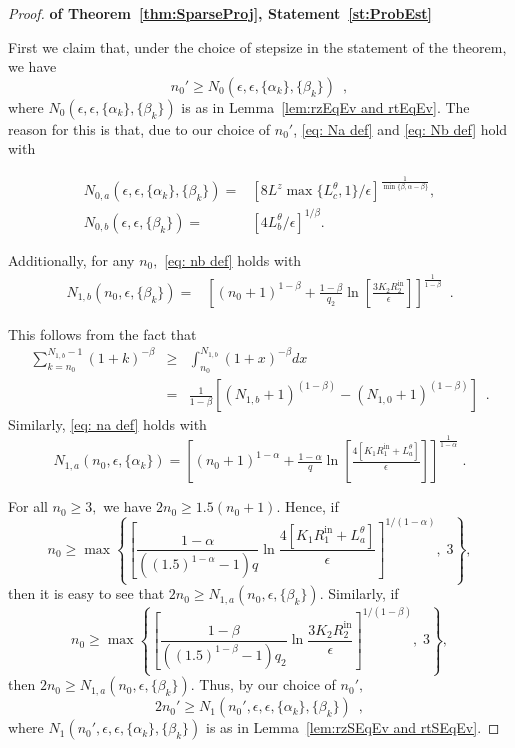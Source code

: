 \documentclass[usenames,dvipsnames,final,12pt]{colt2018} %
\newcommand{\Rti}{R_1^{\textrm{in}}}
\newcommand{\Kt}{K_1}
\newcommand{\Lt}[1]{L^{\theta}_{#1}}
\newcommand{\lz}{q_2}
\newcommand{\Rzi}{R_2^{\textrm{in}}}
\newcommand{\Lz}{L^z}
\newcommand{\Kz}{K_2}
\newcommand{\N}[1]{N_{0,#1}}
\newcommand{\n}[1]{N_{1,#1}}
\newcommand{\lm}{q}
\newcommand{\gugan}[1]{#1}
\begin{document}
\begin{proof}\textbf{of Theorem~\ref{thm:SparseProj}, Statement~\ref{st:ProbEst}}
%
{
First we claim that, under the choice of stepsize in the statement of the theorem, we have
\begin{equation}
%
\label{eq: n0' satisfies N0 constraint}
%
n_0' \geq N_0(\epsilon,\epsilon,\{\alpha_k\},\{\beta_k\}) \enspace,
\end{equation}
%
\gugan{where $N_0(\epsilon, \epsilon, \{\alpha_k\}, \{\beta_k\})$ is as in Lemma~\ref{lem:rzEqEv and rtEqEv}.
The reason for this is that, due to our choice of $n_0'$,
\eqref{eq: Na def} and \eqref{eq: Nb def} hold with
%
\gugan{
\begin{align*}
\N{a}(\epsilon,\epsilon,\{\alpha_k\},\{\beta_k\}) = &
\left[8\Lz \max\{\Lt{c}, 1 \} / \epsilon \right]^{\frac{1}{\min\{\beta,\alpha-\beta\}}},
%
\\
%
\N{b}(\epsilon,\epsilon,\{\beta_k\}) = &
\left[4\Lt{b}/\epsilon\right]^{1/\beta}.
\end{align*}
}
%
}
}

Additionally, \gugan{for any $n_0,$} \eqref{eq: nb def} holds with
\begin{align*}
\n{b}(n_0,\epsilon, \{\beta_k\})
=&
\left[(n_0+1)^{1-\beta} + \tfrac{1-\beta}{\lz}\ln\left[\tfrac{3\Kz \Rzi}{\epsilon}\right]\right]^{\frac{1}{1-\beta}} \enspace.
\end{align*}
%
\gugan{
This follows from the fact that
%
\begin{eqnarray}
\sum_{k=n_0}^{\n{b} -1} (1+k)^{-\beta} & \geq & \int_{n_0}^{\n{b}} (1+x)^{-\beta} dx \\
& = & \frac{1}{1-\beta}\left[ (\n{b}+1)^{(1-\beta)} - (\n{0}+1)^{(1-\beta)}\right] \enspace.
\end{eqnarray}}Similarly, \eqref{eq: na def} holds with
%
\[
\n{a}(n_0,\epsilon, \{\alpha_k\}) =
\left[(n_0+1)^{1-\alpha} +\tfrac{1-\alpha}{\lm}\ln \left[\tfrac{4[\Kt \Rti + \Lt{a}]}{\epsilon}\right]\right]^{\frac{1}{1-\alpha}} \; .
\]

\gugan{
For all $n_0 \geq 3,$ we have  $2n_0 \geq 1.5(n_0 + 1).$ Hence, if
%
\[
n_0 \geq \max\left\{\left[\frac{1-\alpha}{((1.5)^{1-\alpha}-1)\lm}\ln\frac{4[\Kt \Rti + \Lt{a}]}{\epsilon}\right]^{1/(1-\alpha)},\; 3\right\},
\]
%
then it is easy to see that $2 n_0 \geq \n{a}(n_0, \epsilon, \{\beta_k\})$. Similarly, if
%
\[
n_0 \geq \max\left\{\left[\frac{1-\beta}{((1.5)^{1-\beta}-1)\lz}\ln\frac{3\Kz \Rzi}{\epsilon}\right]^{1/(1-\beta)},\; 3\right\},
\]
%
then $2 n_0  \geq \n{a}(n_0, \epsilon, \{\beta_k\}).$ Thus, by our} choice of $n_0',$
\begin{equation}
%
\label{eq: n0' satisfies N1 constraint}
%
2n_0' \geq N_1(n_0',\epsilon,\epsilon,\{\alpha_k\},\{\beta_k\}) \enspace,
\end{equation}
%
\gugan{where $N_1(n_0', \epsilon, \epsilon, \{\alpha_k\}, \{\beta_k\})$ is as in Lemma~\ref{lem:rzSEqEv and rtSEqEv}.}


\end{proof}
\end{document}
